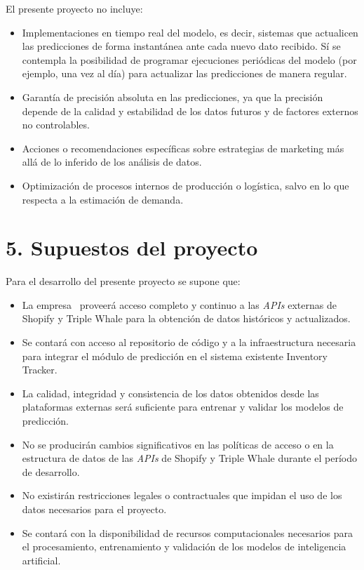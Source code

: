 \documentclass[
11pt, %
]{charter}
\begin{document}
El presente proyecto no incluye:
\begin{itemize}
\item Implementaciones en tiempo real del modelo, es decir, sistemas que actualicen las predicciones de forma instantánea ante cada nuevo dato recibido. Sí se contempla la posibilidad de programar ejecuciones periódicas del modelo (por ejemplo, una vez al día) para actualizar las predicciones de manera regular.
\item Garantía de precisión absoluta en las predicciones, ya que la precisión depende de la calidad y estabilidad de los datos futuros y de factores externos no controlables.
\item Acciones o recomendaciones específicas sobre estrategias de marketing más allá de lo inferido de los análisis de datos.
\item Optimización de procesos internos de producción o logística, salvo en lo que respecta a la estimación de demanda.
\end{itemize}



\section{5. Supuestos del proyecto}
\label{sec:supuestos}

Para el desarrollo del presente proyecto se supone que: 

\begin{itemize}
\item La empresa \empclientename\ proveerá acceso completo y continuo a las \textit{APIs} externas de Shopify y Triple Whale para la obtención de datos históricos y actualizados.
\item Se contará con acceso al repositorio de código y a la infraestructura necesaria para integrar el módulo de predicción en el sistema existente Inventory Tracker.
\item La calidad, integridad y consistencia de los datos obtenidos desde las plataformas externas será suficiente para entrenar y validar los modelos de predicción.
\item No se producirán cambios significativos en las políticas de acceso o en la estructura de datos de las \textit{APIs} de Shopify y Triple Whale durante el período de desarrollo.
\item No existirán restricciones legales o contractuales que impidan el uso de los datos necesarios para el proyecto.
\item Se contará con la disponibilidad de recursos computacionales necesarios para el procesamiento, entrenamiento y validación de los modelos de inteligencia artificial.
\end{itemize}
\end{document}
